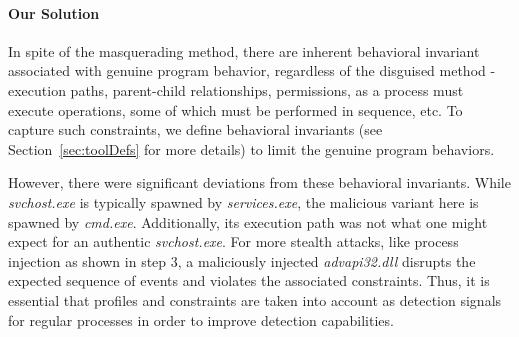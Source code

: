 \paragraph{Our Solution}
\label{sec:intuition}

In spite of the masquerading method, there are inherent behavioral invariant associated with genuine program behavior, regardless of the disguised method - execution paths, parent-child relationships, permissions, as a process must execute operations, some of which must be performed in sequence, etc.
To capture such constraints, we define behavioral invariants (see Section~\ref{sec:toolDefs} for more details) to limit the genuine program behaviors.


However, there were significant deviations from these behavioral invariants. 
While \textit{svchost.exe} is typically spawned by \textit{services.exe}, the malicious variant here is spawned by \textit{cmd.exe}. Additionally, its execution path was not what one might expect for an authentic \textit{svchost.exe}.
For more stealth attacks, like process injection as shown in step 3, a maliciously injected \textit{advapi32.dll} disrupts the expected sequence of events and violates the associated constraints. Thus, it is essential that profiles and constraints are taken into account as detection signals for regular processes in order to improve detection capabilities.





